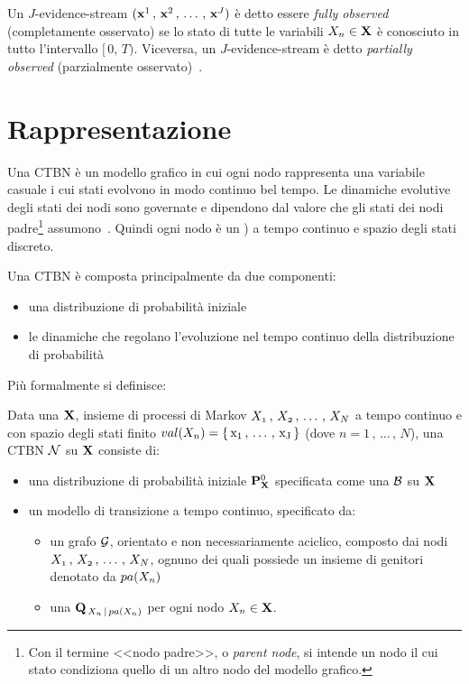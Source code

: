 Un $J$-evidence-stream $(\mathbf{x}^1\,,\,\mathbf{x}^2\,,\,\dotsc\,,\,\mathbf{x}^J)$ è detto essere \emph{fully observed} (completamente osservato) se lo stato di tutte le variabili $\mathnormal{X_n}\in\mathbf{X}$ è conosciuto in tutto l'intervallo $[\,0,\,T)$. Viceversa, un $J$-evidence-stream è detto \emph{partially observed} (parzialmente osservato)~\cite{Stella2012}.

\section{Rappresentazione}
\label{sec:ctbn-rappresentazione}
Una \acl{CTBN} è un modello grafico in cui ogni nodo rappresenta una variabile casuale i cui stati evolvono in modo continuo bel tempo. Le dinamiche evolutive degli stati dei nodi sono governate e dipendono dal valore che gli stati dei nodi padre\footnote{Con il termine <<nodo padre>>, o \emph{parent node}, si intende un nodo il cui stato condiziona quello di un altro nodo del modello grafico.} assumono~\cite{Stella2012}. Quindi ogni nodo è un \mprocess*{} \cond*{} ) a tempo continuo e spazio degli stati discreto.

Una \acs{CTBN} è composta principalmente da due componenti:
\begin{itemize}
    \item una distribuzione di probabilità iniziale
    \item le dinamiche che regolano l'evoluzione nel tempo continuo della distribuzione di probabilità
\end{itemize}
Più formalmente si definisce:
\begin{definizione}
\label{defn:ctbn}
Data una \pv{} $\mathbf{X}$, insieme di processi di Markov $\mathnormal{X_1}\,,\,\mathnormal{X_2}\,,\,\dotsc\,,\,\mathnormal{X_N}$ a tempo continuo e con spazio degli stati finito $val(\mathnormal{X_n})=\{\,\mathrm{x_1}\,,\,\dotsc\,,\,\mathrm{x_J}\,\}$ (dove $n=1\,,\,\dotsc\,,\,N$), una \acs{CTBN} $\mathcal{N}$ su $\mathbf{X}$ consiste di:
\begin{itemize}
    \item una distribuzione di probabilità iniziale $\mathbf{P}^0_{\mathbf{X}}$ specificata come una \bn{} $\mathcal{B}$ su $\mathbf{X}$
    \item un modello di transizione a tempo continuo, specificato da:
    \begin{itemize}
        \item un grafo $\mathcal{G}$, orientato e non necessariamente aciclico, composto dai nodi $\mathnormal{X_1}\,,\,\mathnormal{X_2}\,,\,\dotsc\,,\,\mathnormal{X_N}$, ognuno dei quali possiede un insieme di genitori denotato da $pa(\mathnormal{X_n})$
        \item una \im*{} \cond*{} $\mathbf{Q}_{\,\mathnormal{X_n}\,\arrowvert\,pa(\mathnormal{X_n})}$ per ogni nodo $\mathnormal{X_n} \in \mathbf{X}$.
    \end{itemize}
\end{itemize}
\end{definizione}

